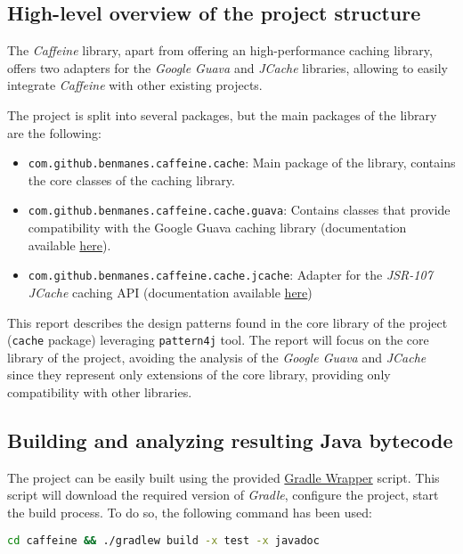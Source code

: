 \subsection{High-level overview of the project structure}

The \textit{Caffeine} library, apart from offering an high-performance caching library, offers two adapters for the \textit{Google Guava} and \textit{JCache} libraries, allowing to easily integrate \textit{Caffeine} with other existing projects.

The project is split into several packages, but the main packages of the library are the following:

\begin{itemize}
	\item \texttt{com.github.benmanes.caffeine.cache}: Main package of the library, contains the core classes of the caching library.
	\item \texttt{com.github.benmanes.caffeine.cache.guava}: Contains classes that provide compatibility with the Google Guava caching library (documentation available \href{https://github.com/ben-manes/caffeine/wiki/Guava"}{here}).
	\item \texttt{com.github.benmanes.caffeine.cache.jcache}: Adapter for the \textit{JSR-107 JCache} caching API (documentation available \href{https://github.com/ben-manes/caffeine/wiki/JCache}{here})
\end{itemize}

\noindent This report describes the design patterns found in the core library of the project (\texttt{cache} package) leveraging \texttt{pattern4j} tool. The report will focus on the core library of the project, avoiding the analysis of the \textit{Google Guava} and \textit{JCache} since they represent only extensions of the core library, providing only compatibility with other libraries.

\subsection{Building and analyzing resulting Java bytecode}
\label{sec:building}

The project can be easily built using the provided \href{https://docs.gradle.org/current/userguide/gradle_wrapper.html}{Gradle Wrapper} script. This script will download the required version of \textit{Gradle}, configure the project, start the build process. To do so, the following command has been used:

\begin{lstlisting}[language=bash, caption={Building the \textit{Caffeine} library using the provided \textit{Gradle Wrapper} script}]
              cd caffeine && ./gradlew build -x test -x javadoc
\end{lstlisting}

